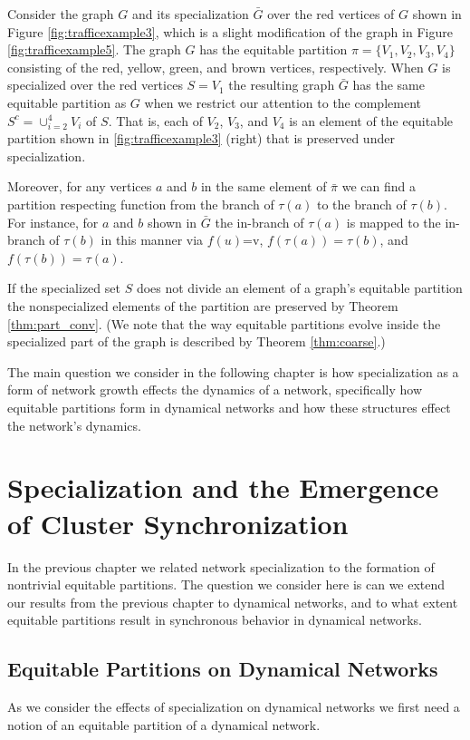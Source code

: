 \documentclass[12pt]{thesis}
\begin{document}
\begin{example}\label{ex:thm2}
Consider the graph $G$ and its specialization $\bar{G}$ over the red vertices of $G$ shown in Figure \ref{fig:trafficexample3}, which is a slight modification of the graph in Figure \ref{fig:trafficexample5}.
The graph $G$ has the equitable partition $\pi=\{V_1,V_2,V_3,V_4\}$ consisting of the red, yellow, green, and brown vertices, respectively.
When $G$ is specialized over the red vertices $S=V_1$ the resulting graph $\bar{G}$ has the same equitable partition as $G$ when we restrict our attention to the complement $S^c=\cup_{i=2}^4 V_i$ of $S$.
That is, each of $V_2$, $V_3$, and $V_4$ is an element of the equitable partition shown in \ref{fig:trafficexample3} (right) that is preserved under specialization.

Moreover, for any vertices $a$ and $b$ in the same element of $\bar{\pi}$ we can find a partition respecting function from the branch of $\tau(a)$ to the branch of $\tau(b)$.
For instance, for $a$ and $b$ shown in $\bar{G}$ the in-branch of $\tau(a)$ is mapped to the in-branch of $\tau(b)$ in this manner via $f(u)$=v, $f(\tau(a))=\tau(b)$, and $f(\tau(b))=\tau(a)$.
\end{example}

If the specialized set $S$ does not divide an element of a graph's equitable partition the nonspecialized elements of the partition are preserved by Theorem \ref{thm:part_conv}. (We note that the way equitable partitions evolve inside the specialized part of the graph is described by Theorem \ref{thm:coarse}.)  

The main question we consider in the following chapter is how specialization as a form of network growth effects the dynamics of a network, specifically how equitable partitions form in dynamical networks and how these structures effect the network's dynamics.

\chapter{Specialization and the Emergence of Cluster Synchronization}\label{chapt:sync}
In the previous chapter we related network specialization to the formation of nontrivial equitable partitions.
The question we consider here is can we extend our results from the previous chapter to dynamical networks, and to what extent equitable partitions result in synchronous behavior in dynamical networks.

\section{Equitable Partitions on Dynamical Networks}
As we consider the effects of specialization on dynamical networks we first need a notion of an equitable partition of a dynamical network.
\end{document}
